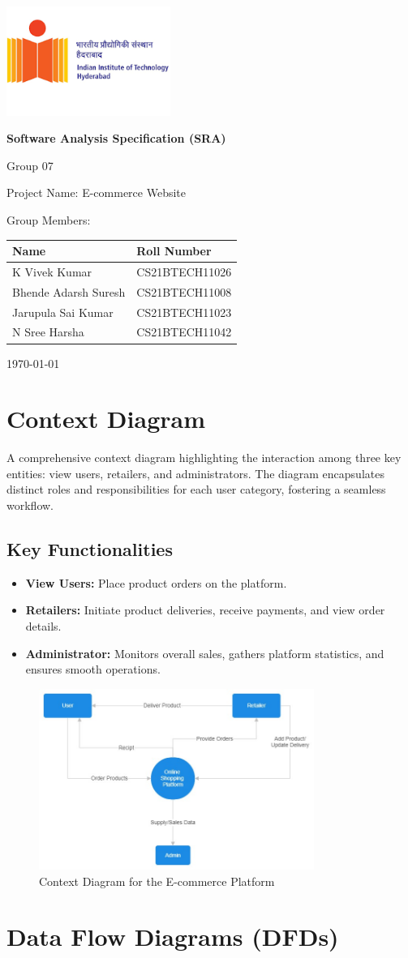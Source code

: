 \documentclass[a4paper,12pt]{article}
\renewcommand{\maketitle}{
    \begin{titlepage}
        \centering
        \includegraphics[width=0.4\textwidth]{iith_logo.png} 
        \vspace{2cm} %
        
        {\color{titlecolor}\Huge\bfseries Software Analysis Specification (SRA)\par}
        \vspace{1.5cm} %
        {\color{black}\large Group 07\par}
        {\color{subtitlecolor}\Large Project Name: E-commerce Website\par}
        \vspace{0.5cm} %
        
        {\fontsize{14}{18}\selectfont Group Members:\par}
        \vspace{0.2cm} %
        {\large
        \begin{center}
            \begin{tabular}{|l|l|}
                \hline
                \textbf{Name} & \textbf{Roll Number} \\
                \hline
                K Vivek Kumar & CS21BTECH11026 \\
                Bhende Adarsh Suresh & CS21BTECH11008 \\
                Jarupula Sai Kumar & CS21BTECH11023 \\
                N Sree Harsha & CS21BTECH11042 \\
                \hline
            \end{tabular}
        \end{center}
        }
        \vspace{0.5cm} %
        
        {\large\today\par}
        \vspace{1cm} %
    \end{titlepage}
}
\begin{document}
\maketitle

\newpage
\tableofcontents
\newpage

\section{Context Diagram}

A comprehensive context diagram highlighting the interaction among three key entities: view users, retailers, and administrators. The diagram encapsulates distinct roles and responsibilities for each user category, fostering a seamless workflow.

\subsection{Key Functionalities}

\begin{itemize}
  \item \textbf{View Users:} Place product orders on the platform.
  \item \textbf{Retailers:} Initiate product deliveries, receive payments, and view order details.
  \item \textbf{Administrator:} Monitors overall sales, gathers platform statistics, and ensures smooth operations.
\end{itemize}

\begin{figure}
    \centering
    \includegraphics[width=0.8\textwidth]{cfd.jpg}
    \caption{Context Diagram for the E-commerce Platform}
\end{figure}


\section{Data Flow Diagrams (DFDs)}
\end{document}
